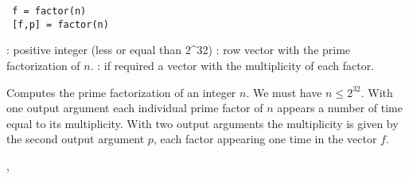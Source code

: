 
\begin{mandesc}
\end{mandesc}

\begin{calling_sequence}
\begin{verbatim}
 f = factor(n)
 [f,p] = factor(n)
\end{verbatim}
\end{calling_sequence}

\begin{parameters}
  \begin{varlist}
   : positive integer (less or equal than 2^32)
   : row vector with the prime factorization of $n$.
   : if required a vector with the multiplicity of each factor.
  \end{varlist}
\end{parameters}

\begin{mandescription}
  Computes the prime factorization of an integer $n$. We must have $n
  \le 2^{32}$. With one output argument each individual prime factor
  of $n$ appears a number of time equal to its multiplicity. With two
  output arguments the multiplicity is given by the second output
  argument $p$, each factor appearing one time in the vector $f$.

\end{mandescription}

\begin{examples}
\begin{program}
\end{program}
\end{examples}


\begin{manseealso}
, 
\end{manseealso}


